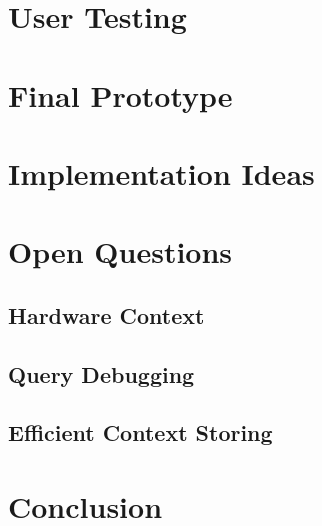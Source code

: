 \documentclass[runningheads]{llncs}
\begin{document}
\section{User Testing}

\section{Final Prototype}

\section{Implementation Ideas}

\section{Open Questions}
\subsection{Hardware Context}
\subsection{Query Debugging}
\subsection{Efficient Context Storing}

\section{Conclusion}

%

\end{document}
